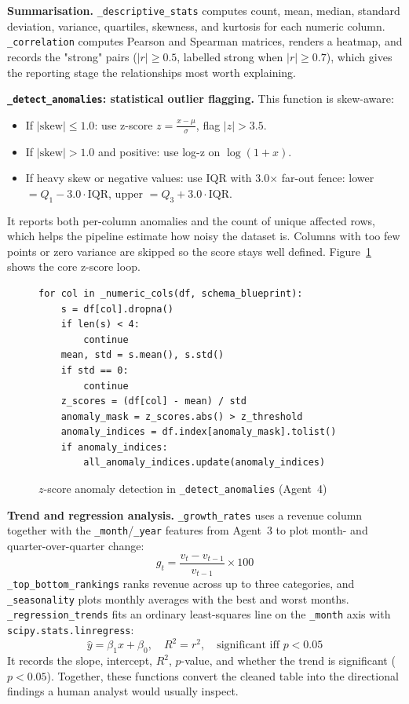 \documentclass[12pt,a4paper,openany]{report}
\begin{document}
\textbf{Summarisation.} \texttt{\_descriptive\_stats} computes count, mean, median, standard deviation, variance, quartiles, skewness, and kurtosis for each numeric column. \texttt{\_correlation} computes Pearson and Spearman matrices, renders a heatmap, and records the "strong" pairs ($|r| \geq 0.5$, labelled strong when $|r| \geq 0.7$), which gives the reporting stage the relationships most worth explaining.

\textbf{\texttt{\_detect\_anomalies}: statistical outlier flagging.} This function is skew-aware:
\begin{itemize}
	\item If $|\text{skew}| \le 1.0$: use z-score $z = \frac{x - \mu}{\sigma}$, flag $|z| > 3.5$.
	\item If $|\text{skew}| > 1.0$ and positive: use log-z on $\log(1+x)$.
	\item If heavy skew or negative values: use IQR with 3.0$\times$ far-out fence: lower $= Q_1 - 3.0 \cdot \text{IQR}$, upper $= Q_3 + 3.0 \cdot \text{IQR}$.
\end{itemize}
It reports both per-column anomalies and the count of unique affected rows, which helps the pipeline estimate how noisy the dataset is. Columns with too few points or zero variance are skipped so the score stays well defined. Figure~\ref{fig:code-agent4-anom} shows the core z-score loop.

\begin{figure}[H]
\centering
\begin{lstlisting}[style=pystyle]
for col in _numeric_cols(df, schema_blueprint):
    s = df[col].dropna()
    if len(s) < 4:
        continue
    mean, std = s.mean(), s.std()
    if std == 0:
        continue
    z_scores = (df[col] - mean) / std
    anomaly_mask = z_scores.abs() > z_threshold
    anomaly_indices = df.index[anomaly_mask].tolist()
    if anomaly_indices:
        all_anomaly_indices.update(anomaly_indices)
\end{lstlisting}
\caption{$z$-score anomaly detection in \texttt{\_detect\_anomalies} (Agent~4)}
\label{fig:code-agent4-anom}
\end{figure}

\textbf{Trend and regression analysis.} \texttt{\_growth\_rates} uses a revenue column together with the \texttt{\_month}/\texttt{\_year} features from Agent~3 to plot month- and quarter-over-quarter change:
\begin{equation}
g_t = \frac{v_t - v_{t-1}}{v_{t-1}} \times 100
\label{eq:growth}
\end{equation}
\texttt{\_top\_bottom\_rankings} ranks revenue across up to three categories, and \texttt{\_seasonality} plots monthly averages with the best and worst months. \texttt{\_regression\_trends} fits an ordinary least-squares line on the \texttt{\_month} axis with \texttt{scipy.stats.linregress}:
\begin{equation}
\hat{y} = \beta_1 x + \beta_0, \quad R^2 = r^2, \quad \text{significant iff } p < 0.05
\label{eq:ols}
\end{equation}
It records the slope, intercept, $R^2$, $p$-value, and whether the trend is significant ($p < 0.05$). Together, these functions convert the cleaned table into the directional findings a human analyst would usually inspect.
\end{document}
